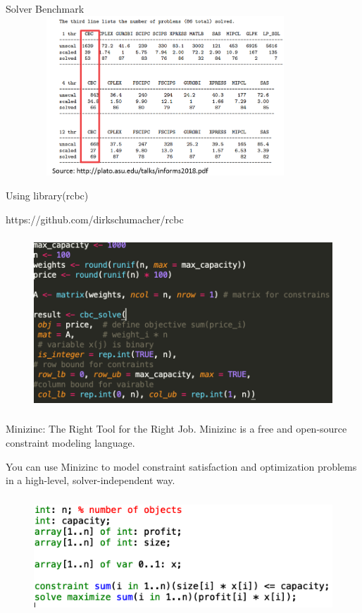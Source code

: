 \documentclass[xcolor=dvipsnames,aspectratio=169]{beamer}
\begin{document}
\begin{frame}{Solver Benchmark}
\includegraphics[width=120mm, height = 60mm]{benchmark2.PNG}
    
\end{frame}


\begin{frame}{Using library(rcbc)}


https://github.com/dirkschumacher/rcbc

\begin{figure}[t]
  \includegraphics[height =6.5cm]{knapsack.png}

\centering
\end{figure}
\end{frame}



\begin{frame}{Minizinc: The Right Tool for the Right Job.}
Minizinc is a free and open-source constraint modeling language.

You can use Minizinc to model constraint 
satisfaction and optimization problems in a 
high-level, solver-independent way.

    \begin{figure}
    \centering
        \includegraphics[height =4.4cm]{Minizinc_knapsack.png}
    \end{figure}
\end{frame}
\end{document}
